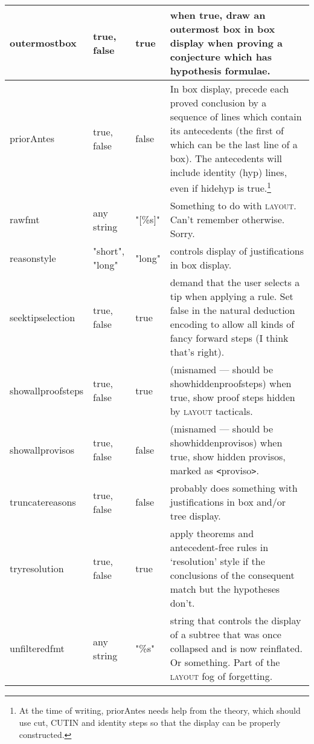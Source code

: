 \begin{longtable}{|l|p{2cm}|l|p{2.5in}|}
{\raggedright outermostbox} & {\raggedright true, false} & {\raggedright true} & {\raggedright when true, draw an outermost box in box display when proving a conjecture which has hypothesis formulae.}\\
\hline

priorAntes & true, false & false & In box display, precede each proved conclusion by a sequence of lines which contain its antecedents (the first of which can be the last line of a box). The antecedents will include identity (hyp) lines, even if hidehyp is true.\footnote{ At the time of writing, priorAntes needs help from the theory, which should use cut, \textsc{CUTIN} and identity steps so that the display can be properly constructed.}\\
\hline

rawfmt & any string & "{[}\%s{]}"  & Something to do with \textsc{layout}. Can't remember otherwise. Sorry.\\ \hline

reasonstyle & "short", "long" & "long" & controls display of justifications in box display.\\ \hline

seektipselection & true, false & true & demand that the user selects a tip when applying a rule. Set false in the natural deduction encoding to allow all kinds of fancy forward steps (I think that's right).\\ \hline

{\raggedright showallproofsteps} & {\raggedright true, false} & {\raggedright true} & {\raggedright (misnamed --- should be showhiddenproofsteps) when true, show proof steps hidden by \textsc{layout} tacticals.}\\
\hline
{\raggedright showallprovisos} & {\raggedright true, false} & {\raggedright false} & {\raggedright (misnamed --- should be showhiddenprovisos) when true, show hidden provisos, marked as \texttt{<}proviso\texttt{>}.}\\
\hline

truncatereasons & true, false & false & probably does something with justifications in box and/or tree display.\\ \hline

{\raggedright tryresolution} & {\raggedright true, false} & {\raggedright true} & {\raggedright apply theorems and antecedent-free rules in `resolution' style if the conclusions of the consequent match but the hypotheses don't.}\\
\hline
{\raggedright unfilteredfmt} & {\raggedright any string} & {\raggedright "\%s"} & {\raggedright string that controls the display of a subtree that was once collapsed and is now reinflated. Or something. Part of the \textsc{layout} fog of forgetting.}\\
\hline
\end{longtable}



